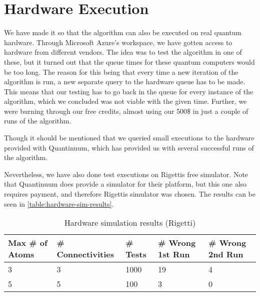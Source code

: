 \section{Hardware Execution}\label{sec:hardware-execution}
We have made it so that the algorithm can also be executed on real quantum hardware.
Through Microsoft Azure's workspace, we have gotten access to hardware from different vendors.
The idea was to test the algorithm in one of these, but it turned out that the queue times for these quantum computers would be too long.
The reason for this being that every time a new iteration of the algorithm is run, a new separate query to the hardware queue has to be made.
This means that our testing has to go back in the queue for every instance of the algorithm, which we concluded was not viable with the given time.
Further, we were burning through our free credits, almost using our 500\$ in just a couple of runs of the algorithm.

Though it should be mentioned that we queried small executions to the hardware provided with Quantinuum, which has provided us with several successful runs of the algorithm.

Nevertheless, we have also done test executions on Rigettis free simulator.
Note that Quantinuum does provide a simulator for their platform, but this one also requires payment, and therefore Rigettis simulator was chosen.
The results can be seen in \autoref{table:hardware-sim-results}.

\begin{table}[h!]
\centering
\begin{tabularx}{\textwidth}{|X|X|X|X|X|}
\hline
Max \# of Atoms & \# Connectivities & \# Tests &  \# Wrong 1st Run & \# Wrong 2nd Run \\
\hline
3 & 3 & 1000 & 19 & 4 \\
5 & 5 &  100 &  3 & 0 \\
\hline
\end{tabularx}
\caption{Hardware simulation results (Rigetti)}
\label{table:hardware-sim-results}
\end{table}
